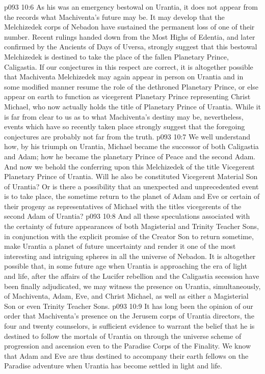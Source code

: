 \vs p093 10:6 As his was an emergency bestowal on Urantia, it does not appear from the records what Machiventa’s future may be. It may develop that the Melchizedek corps of Nebadon have sustained the permanent loss of one of their number. Recent rulings handed down from the Most Highs of Edentia, and later confirmed by the Ancients of Days of Uversa, strongly suggest that this bestowal Melchizedek is destined to take the place of the fallen Planetary Prince, Caligastia. If our conjectures in this respect are correct, it is altogether possible that Machiventa Melchizedek may again appear in person on Urantia and in some modified manner resume the role of the dethroned Planetary Prince, or else appear on earth to function as vicegerent Planetary Prince representing Christ Michael, who now actually holds the title of Planetary Prince of Urantia. While it is far from clear to us as to what Machiventa’s destiny may be, nevertheless, events which have so recently taken place strongly suggest that the foregoing conjectures are probably not far from the truth.
\vs p093 10:7 We well understand how, by his triumph on Urantia, Michael became the successor of both Caligastia and Adam; how he became the planetary Prince of Peace and the second Adam. And now we behold the conferring upon this Melchizedek of the title Vicegerent Planetary Prince of Urantia. Will he also be constituted Vicegerent Material Son of Urantia? Or is there a possibility that an unexpected and unprecedented event is to take place, the sometime return to the planet of Adam and Eve or certain of their progeny as representatives of Michael with the titles vicegerents of the second Adam of Urantia?
\vs p093 10:8 And all these speculations associated with the certainty of future appearances of both Magisterial and Trinity Teacher Sons, in conjunction with the explicit promise of the Creator Son to return sometime, make Urantia a planet of future uncertainty and render it one of the most interesting and intriguing spheres in all the universe of Nebadon. It is altogether possible that, in some future age when Urantia is approaching the era of light and life, after the affairs of the Lucifer rebellion and the Caligastia secession have been finally adjudicated, we may witness the presence on Urantia, simultaneously, of Machiventa, Adam, Eve, and Christ Michael, as well as either a Magisterial Son or even Trinity Teacher Sons.
\vs p093 10:9 It has long been the opinion of our order that Machiventa’s presence on the Jerusem corps of Urantia directors, the four and twenty counselors, is sufficient evidence to warrant the belief that he is destined to follow the mortals of Urantia on through the universe scheme of progression and ascension even to the Paradise Corps of the Finality. We know that Adam and Eve are thus destined to accompany their earth fellows on the Paradise adventure when Urantia has become settled in light and life.
